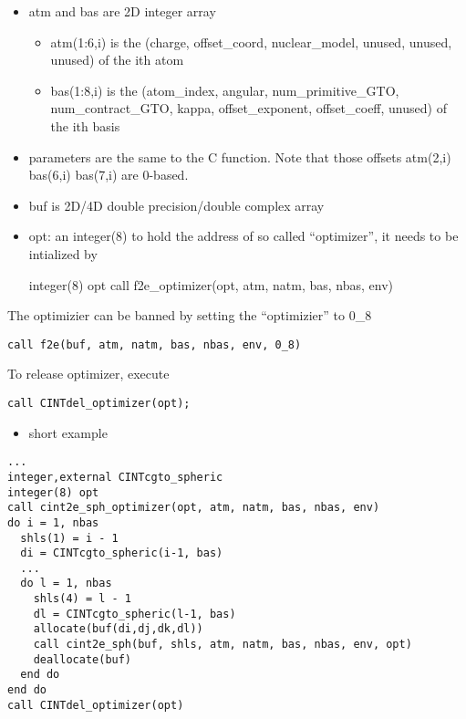 \documentclass[]{article}
\begin{document}
\begin{itemize}
\item
  atm and bas are 2D integer array

  \begin{itemize}
  \itemsep1pt\parskip0pt
  \item
    atm(1:6,i) is the (charge, offset\_coord, nuclear\_model, unused,
    unused, unused) of the ith atom
  \item
    bas(1:8,i) is the (atom\_index, angular, num\_primitive\_GTO,
    num\_contract\_GTO, kappa, offset\_exponent, offset\_coeff, unused)
    of the ith basis
  \end{itemize}
\item
  parameters are the same to the C function. Note that those offsets
  atm(2,i) bas(6,i) bas(7,i) are 0-based.
\item
  buf is 2D/4D double precision/double complex array
\item
  opt: an integer(8) to hold the address of so called ``optimizer'', it
  needs to be intialized by

  integer(8) opt call f2e\_optimizer(opt, atm, natm, bas, nbas, env)
\end{itemize}

The optimizier can be banned by setting the ``optimizier'' to 0\_8

\begin{verbatim}
call f2e(buf, atm, natm, bas, nbas, env, 0_8)
\end{verbatim}

To release optimizer, execute

\begin{verbatim}
call CINTdel_optimizer(opt);
\end{verbatim}

\begin{itemize}
\itemsep1pt\parskip0pt
\item
  short example
\end{itemize}

\begin{verbatim}
...
integer,external CINTcgto_spheric
integer(8) opt
call cint2e_sph_optimizer(opt, atm, natm, bas, nbas, env)
do i = 1, nbas
  shls(1) = i - 1
  di = CINTcgto_spheric(i-1, bas)
  ...
  do l = 1, nbas
    shls(4) = l - 1
    dl = CINTcgto_spheric(l-1, bas)
    allocate(buf(di,dj,dk,dl))
    call cint2e_sph(buf, shls, atm, natm, bas, nbas, env, opt)
    deallocate(buf)
  end do
end do
call CINTdel_optimizer(opt)
\end{verbatim}
\end{document}
